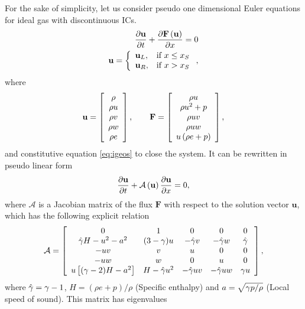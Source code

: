 For the sake of simplicity, let us consider pseudo one dimensional Euler equations for ideal gas with discontinuous ICs.
\begin{align}
\nonumber
\frac {\partial \mathbf u}{\partial t} + \frac {\partial \mathbf F \left(\mathbf u\right)}{\partial x} = 0 \\
\mathbf u = \left\{\begin{array}{ll}
\mathbf u_L, & \textmd{if } x \le x_S \\
\mathbf u_R, & \textmd{if } x > x_S
\end{array}\right.,
\end{align}
where 
\begin{align}
\mathbf u = \left[\begin{array}{c}\rho \\ \rho u \\ \rho v \\ \rho w \\ \rho e \end{array}\right], \qquad \mathbf F = \left[\begin{array}{c}\rho u \\ \rho u^2 + p \\ \rho uv \\ \rho u w \\ u \left(\rho e + p\right)\end{array}\right],
\end{align}
and constitutive equation \eqref{eq:igeos} to close the system. It can be rewritten in pseudo linear form
\begin{align}
\frac {\partial \mathbf u}{\partial t} + \mathcal A \left(\mathbf u\right)\frac {\partial \mathbf u}{\partial x} = 0, \label{eq:Euler}
\end{align}
where $\mathcal A$ is a Jacobian matrix of the flux $\mathbf F$ with respect to the solution vector $\mathbf u$, which has the following explicit relation
\begin{align}
\mathcal A = \left[\begin{array}{ccccc}
0 & 1 & 0 & 0 & 0 \\
\hat {\gamma} H - u^2 - a^2 & (3-\gamma)u & -\hat {\gamma} v  & -\hat {\gamma} w & \hat {\gamma} \\
-u v & v & u & 0 & 0 \\
-u w & w & 0 & u & 0 \\
u \left[(\gamma - 2)H - a^2\right] & H - \hat {\gamma} u^2 & - \hat {\gamma} u v & - \hat {\gamma} u w & \gamma u
\end{array}\right], \label{eq:matrix}
\end{align}
where $\hat {\gamma} = \gamma - 1$, $H = (\rho e + p)/\rho$ (Specific enthalpy) and $a = \sqrt{\gamma p / \rho}$ (Local speed of sound). This matrix has eigenvalues 
